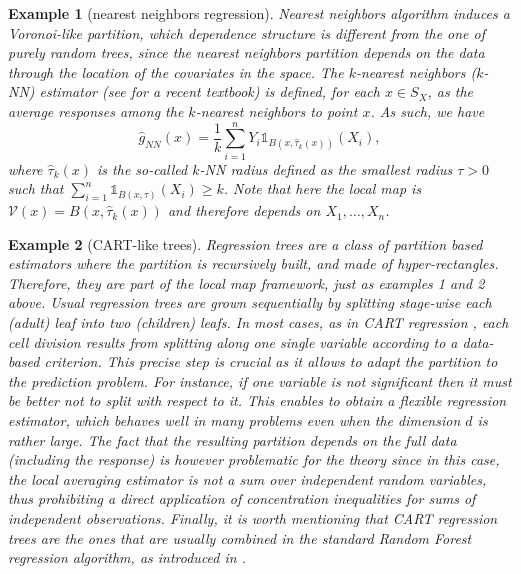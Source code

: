 \documentclass[paper=a4, fontsize=11pt]{scrartcl}
\newcommand{\ind}{\mathds{1}}
\newtheorem{example}{Example}
\begin{document}
\begin{example}[nearest neighbors regression]\label{ex3}
    Nearest neighbors algorithm induces a Voronoi-like partition, which dependence structure is different from the one of purely random trees, since the nearest neighbors partition depends on the data through the location of the covariates in the space. The $k$-nearest neighbors ($k$-NN) estimator (see \cite{biau2015lectures} for a recent textbook) is defined, for each $x\in S_X$, as the average responses among the $k$-nearest neighbors to point $x$. As such, we have
$$ \hat g_{NN}(x) =  \frac{1}{k }  \sum_{i=1}^n  Y_i\ind_{B(x, \hat \tau_k(x))} (X_i ) ,$$
where $\hat \tau_k(x)$ is the so-called $k$-NN radius defined as the smallest radius $\tau>0 $ such that $\sum_{i=1}^n  \ind_{B(x,  \tau ) } (X_i ) \geq k$.
Note that here the local map is $\mathcal V (x)  = B(x, \hat \tau_k(x))$ and therefore  depends on $X_1,\ldots, X_n$.
\end{example}


\begin{example}[{CART-like trees}]
Regression trees are a class of partition based estimators where the partition is recursively built, and made of hyper-rectangles. Therefore, they are part of the local map framework, just as examples 1 and 2 above. Usual regression trees are grown sequentially by splitting stage-wise each (adult) leaf into two (children) leafs. In most cases, as in CART regression \citep{breiman1984classification}, each cell division results from splitting along one single variable according to a data-based criterion. This precise step is crucial as it allows to adapt the partition to the prediction problem. For instance, if one variable is not significant then it must be better not to split with respect to it. This enables to obtain a flexible regression estimator, which behaves well in many problems even when the dimension $d$ is rather large. The fact that the resulting partition depends on the full data (including the response) is however problematic for the theory since in this case, the local averaging estimator is not a sum over independent random variables, thus prohibiting a direct application of concentration inequalities for sums of independent observations. Finally, it is worth mentioning that CART regression trees are the ones that are usually combined in the standard Random Forest regression algorithm, as introduced in \cite{breiman2001random}.
 \end{example}
\end{document}
